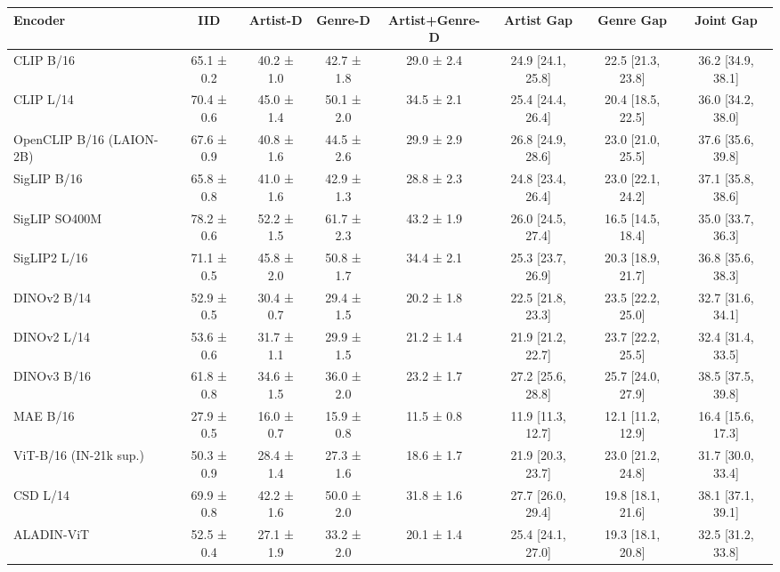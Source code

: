 \begin{tabular}{lccccccc}
\toprule
Encoder & IID & Artist-D & Genre-D & Artist+Genre-D & Artist Gap & Genre Gap & Joint Gap \\
\midrule
CLIP B/16 & 65.1 ± 0.2 & 40.2 ± 1.0 & 42.7 ± 1.8 & 29.0 ± 2.4 & 24.9 [24.1, 25.8] & 22.5 [21.3, 23.8] & 36.2 [34.9, 38.1] \\
CLIP L/14 & 70.4 ± 0.6 & 45.0 ± 1.4 & 50.1 ± 2.0 & 34.5 ± 2.1 & 25.4 [24.4, 26.4] & 20.4 [18.5, 22.5] & 36.0 [34.2, 38.0] \\
OpenCLIP B/16 (LAION-2B) & 67.6 ± 0.9 & 40.8 ± 1.6 & 44.5 ± 2.6 & 29.9 ± 2.9 & 26.8 [24.9, 28.6] & 23.0 [21.0, 25.5] & 37.6 [35.6, 39.8] \\
SigLIP B/16 & 65.8 ± 0.8 & 41.0 ± 1.6 & 42.9 ± 1.3 & 28.8 ± 2.3 & 24.8 [23.4, 26.4] & 23.0 [22.1, 24.2] & 37.1 [35.8, 38.6] \\
SigLIP SO400M & 78.2 ± 0.6 & 52.2 ± 1.5 & 61.7 ± 2.3 & 43.2 ± 1.9 & 26.0 [24.5, 27.4] & 16.5 [14.5, 18.4] & 35.0 [33.7, 36.3] \\
SigLIP2 L/16 & 71.1 ± 0.5 & 45.8 ± 2.0 & 50.8 ± 1.7 & 34.4 ± 2.1 & 25.3 [23.7, 26.9] & 20.3 [18.9, 21.7] & 36.8 [35.6, 38.3] \\
DINOv2 B/14 & 52.9 ± 0.5 & 30.4 ± 0.7 & 29.4 ± 1.5 & 20.2 ± 1.8 & 22.5 [21.8, 23.3] & 23.5 [22.2, 25.0] & 32.7 [31.6, 34.1] \\
DINOv2 L/14 & 53.6 ± 0.6 & 31.7 ± 1.1 & 29.9 ± 1.5 & 21.2 ± 1.4 & 21.9 [21.2, 22.7] & 23.7 [22.2, 25.5] & 32.4 [31.4, 33.5] \\
DINOv3 B/16 & 61.8 ± 0.8 & 34.6 ± 1.5 & 36.0 ± 2.0 & 23.2 ± 1.7 & 27.2 [25.6, 28.8] & 25.7 [24.0, 27.9] & 38.5 [37.5, 39.8] \\
MAE B/16 & 27.9 ± 0.5 & 16.0 ± 0.7 & 15.9 ± 0.8 & 11.5 ± 0.8 & 11.9 [11.3, 12.7] & 12.1 [11.2, 12.9] & 16.4 [15.6, 17.3] \\
ViT-B/16 (IN-21k sup.) & 50.3 ± 0.9 & 28.4 ± 1.4 & 27.3 ± 1.6 & 18.6 ± 1.7 & 21.9 [20.3, 23.7] & 23.0 [21.2, 24.8] & 31.7 [30.0, 33.4] \\
CSD L/14 & 69.9 ± 0.8 & 42.2 ± 1.6 & 50.0 ± 2.0 & 31.8 ± 1.6 & 27.7 [26.0, 29.4] & 19.8 [18.1, 21.6] & 38.1 [37.1, 39.1] \\
ALADIN-ViT & 52.5 ± 0.4 & 27.1 ± 1.9 & 33.2 ± 2.0 & 20.1 ± 1.4 & 25.4 [24.1, 27.0] & 19.3 [18.1, 20.8] & 32.5 [31.2, 33.8] \\
\bottomrule
\end{tabular}
